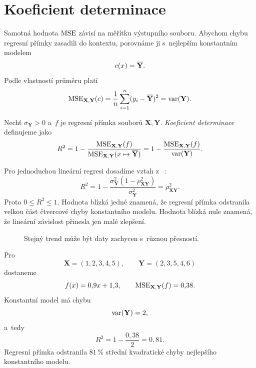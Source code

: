 \section{Koeficient determinace}\label{sec:ai-r2}

Samotná hodnota \(\operatorname{MSE}\) závisí na měřítku výstupního souboru. Abychom chybu regresní přímky zasadili do kontextu, porovnáme ji s~nejlepším konstantním modelem
\[
    c(x)=\overline{\mathbf{Y}}.
\]
Podle vlastností průměru platí
\[
    \operatorname{MSE}_{\mathbf{X},\mathbf{Y}}(c)
    =
    \frac1n\sum_{i=1}^{n}
    (y_i-\overline{\mathbf{Y}})^2
    =
    \operatorname{var}(\mathbf{Y}).
\]

\begin{definition}\label{def:ai-r2}
    Nechť \(\sigma_{\mathbf{Y}}>0\) a~\(f\) je regresní přímka souborů
    \(\mathbf{X},\mathbf{Y}\). \emph{Koeficient determinace} definujeme jako
    \[
        R^2
        =
        1-
        \frac{
            \operatorname{MSE}_{\mathbf{X},\mathbf{Y}}(f)
        }{
            \operatorname{MSE}_{\mathbf{X},\mathbf{Y}}
            (x\mapsto\overline{\mathbf{Y}})
        }
        =
        1-
        \frac{
            \operatorname{MSE}_{\mathbf{X},\mathbf{Y}}(f)
        }{
            \operatorname{var}(\mathbf{Y})
        }.
    \]
\end{definition}

Pro jednoduchou lineární regresi dosadíme vztah z~
:
\[
    R^2
    =
    1-
    \frac{
        \sigma_{\mathbf{Y}}^2
        (1-\rho_{\mathbf{X}\mathbf{Y}}^2)
    }{
        \sigma_{\mathbf{Y}}^2
    }
    =
    \rho_{\mathbf{X}\mathbf{Y}}^2.
\]
Proto \(0\leqslant R^2\leqslant1\). Hodnota blízká jedné znamená, že regresní přímka odstranila velkou část čtvercové chyby konstantního modelu. Hodnota blízká nule znamená, že lineární závislost přinesla jen malé zlepšení.

\begin{figure}[ht]
    \centering
    
    \caption{Stejný trend může být daty zachycen s~různou přesností.}
    \label{fig:ai-r2}
\end{figure}

\begin{example}
    Pro
    \[
        \mathbf{X}=(1,2,3,4,5),
        \qquad
        \mathbf{Y}=(2,3,5,4,6)
    \]
    dostaneme
    \[
        f(x)=0{,}9x+1{,}3,
        \qquad
        \operatorname{MSE}_{\mathbf{X},\mathbf{Y}}(f)=0{,}38.
    \]
    Konstantní model má chybu
    \[
        \operatorname{var}(\mathbf{Y})=2,
    \]
    a~tedy
    \[
        R^2=1-\frac{0{,}38}{2}=0{,}81.
    \]
    Regresní přímka odstranila \(81\,\%\) střední kvadratické chyby nejlepšího konstantního modelu.
\end{example}


